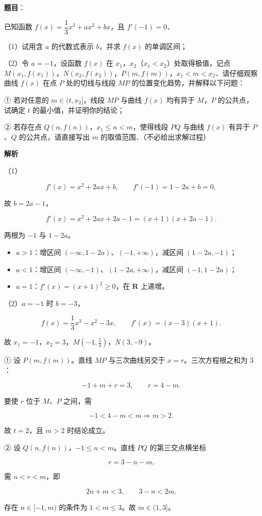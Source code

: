 \begin{answer}

\textbf{题目}：

已知函数 $f(x)=\dfrac13x^3+ax^2+bx$，且 $f'(-1)=0$．

（1）试用含 $a$ 的代数式表示 $b$，并求 $f(x)$ 的单调区间；

（2）令 $a=-1$，设函数 $f(x)$ 在 $x_1$，$x_2$（$x_1<x_2$）处取得极值，记点 $M(x_1,f(x_1))$，$N(x_2,f(x_2))$，$P(m,f(m))$，$x_1<m<x_2$．请仔细观察曲线 $f(x)$ 在点 $P$ 处的切线与线段 $MP$ 的位置变化趋势，并解释以下问题：

① 若对任意的 $m\in(t,x_2]$，线段 $MP$ 与曲线 $f(x)$ 均有异于 $M$，$P$ 的公共点，试确定 $t$ 的最小值，并证明你的结论；

② 若存在点 $Q(n,f(n))$，$x_1\leqslant n<m$，使得线段 $PQ$ 与曲线 $f(x)$ 有异于 $P$、$Q$ 的公共点，请直接写出 $m$ 的取值范围．（不必给出求解过程）

\textbf{解析}

（1）

\nopagebreak[4]
\[f'(x)=x^2+2ax+b,\qquad f'(-1)=1-2a+b=0,\]

故 $b=2a-1$，

\nopagebreak[4]
\[f'(x)=x^2+2ax+2a-1=(x+1)(x+2a-1).\]

两根为 $-1$ 与 $1-2a$。

\begin{itemize}
\item $a>1$：增区间 $(-\infty,1-2a)$、$(-1,+\infty)$，减区间 $(1-2a,-1)$；
\item $a<1$：增区间 $(-\infty,-1)$、$(1-2a,+\infty)$，减区间 $(-1,1-2a)$；
\item $a=1$：$f'(x)=(x+1)^2\geqslant0$，在 $\mathbf R$ 上递增。
\end{itemize}

（2）$a=-1$ 时 $b=-3$，

\nopagebreak[4]
\[f(x)=\frac13x^3-x^2-3x,\qquad f'(x)=(x-3)(x+1).\]

故 $x_1=-1$，$x_2=3$，$M\left(-1,\frac53\right)$，$N(3,-9)$。

① 设 $P(m,f(m))$。直线 $MP$ 与三次曲线另交于 $x=r$。三次方程根之和为 $3$：

\nopagebreak[4]
\[-1+m+r=3,\qquad r=4-m.\]

要使 $r$ 位于 $M$、$P$ 之间，需

\nopagebreak[4]
\[-1<4-m<m\Longrightarrow m>2.\]

故 $t=2$，且 $m>2$ 时结论成立。

② 设 $Q(n,f(n))$，$-1\leqslant n<m$。直线 $PQ$ 的第三交点横坐标

\nopagebreak[4]
\[r=3-n-m.\]

需 $n<r<m$，即

\nopagebreak[4]
\[2n+m<3,\qquad 3-n<2m.\]

存在 $n\in[-1,m)$ 的条件为 $1<m\leqslant3$。故 $m\in(1,3]$。

\gkanswer{答案：（1）$b=2a-1$，单调区间见解析；（2）① $t=2$；② $m\in(1,3]$。}

\end{answer}
